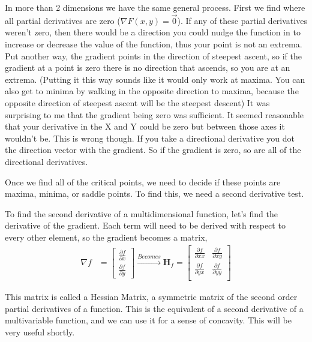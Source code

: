 \documentclass[12pt, letterpaper]{article}
\begin{document}
In more than 2 dimensions we have the same general process. First we find where all partial derivatives are zero ($\nabla F(x, y) = \vec{0}$). If any of these partial derivatives weren't zero, then there would be a direction you could nudge the function in to increase or decrease the value of the function, thus your point is not an extrema. 
Put another way, the gradient points in the direction of steepest ascent, so if the gradient at a point is zero there is no direction that ascends, so you are at an extrema.
(Putting it this way sounds like it would only work at maxima. You can also get to minima by walking in the opposite direction to maxima, because the opposite direction of steepest ascent will be the steepest descent) 
It was surprising to me that the gradient being zero was sufficient. It seemed reasonable that your derivative in the X and Y could be zero but between those axes it wouldn't be. This is wrong though. If you take a directional derivative you dot the direction vector with the gradient. So if the gradient is zero, so are all of the directional derivatives. 

Once we find all of the critical points, we need to decide if these points are maxima, minima, or saddle points. To find this, we need a second derivative test.

To find the second derivative of a multidimensional function, let's find the derivative of the gradient. Each term will need to be derived with respect to every other element, so the gradient becomes a matrix,
\begin{align*}
    \nabla f &= \begin{bmatrix}
        \frac{\partial f}{\partial x}\\
        \frac{\partial f}{\partial y}
    \end{bmatrix}
    \xrightarrow{Becomes}
    \mathbf{H}_f = \begin{bmatrix}
        \frac{\partial f}{\partial xx} & \frac{\partial f}{\partial xy}\\
        \frac{\partial f}{\partial yx} & \frac{\partial f}{\partial yy}\\  
    \end{bmatrix}
\end{align*}

This matrix is called a Hessian Matrix, a symmetric matrix of the second order partial derivatives of a function. 
This is the equivalent of a second derivative of a multivariable function, and we can use it for a sense of concavity.
This will be very useful shortly.
\end{document}
